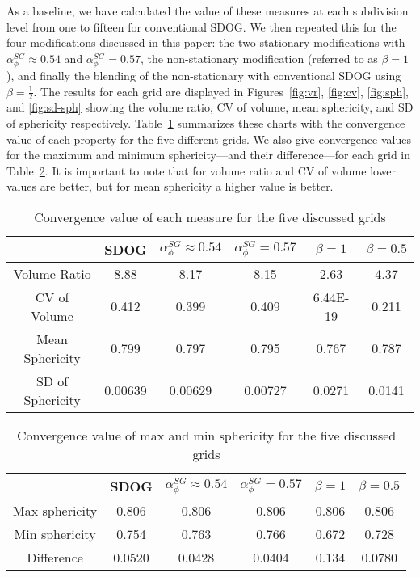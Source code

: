 As a baseline, we have calculated the value of these measures at each subdivision level from one to fifteen for conventional SDOG.
We then repeated this for the four modifications discussed in this paper: the two stationary modifications with $\alpha_{\phi}^{SG} \approx 0.54$ and $\alpha_{\phi}^{SG} = 0.57$, the non-stationary modification (referred to as $\beta = 1$), and finally the blending of the non-stationary with conventional SDOG using $\beta = \frac{1}{2}$.
The results for each grid are displayed in Figures~\ref{fig:vr}, \ref{fig:cv}, \ref{fig:sph}, and \ref{fig:sd-sph} showing the volume ratio, CV of volume, mean sphericity, and SD of sphericity respectively.
Table~\ref{tab:results} summarizes these charts with the convergence value of each property for the five different grids.
We also give convergence values for the maximum and minimum sphericity---and their difference---for each grid in Table~\ref{tab:results-sph}.
It is important to note that for volume ratio and CV of volume lower values are better, but for mean sphericity a higher value is better.


\begin{table}[]
	\centering
	\caption{Convergence value of each measure for the five discussed grids}
	\begin{tabular}{|c|c|c|c|c|c|}
		\hline
		& SDOG & $\alpha_{\phi}^{SG} \approx 0.54$ & $\alpha_{\phi}^{SG} = 0.57$ & $\beta = 1$ & $\beta = 0.5$ \\ \hline
		Volume Ratio     & 8.88   & 8.17   & 8.15   & 2.63      & 4.37   \\ \hline
		CV of Volume     & 0.412  & 0.399  & 0.409  & 6.44E-19  & 0.211  \\ \hline
		Mean Sphericity  & 0.799  & 0.797  & 0.795  & 0.767     & 0.787  \\ \hline
		SD of Sphericity & 0.00639& 0.00629& 0.00727& 0.0271    & 0.0141 \\ \hline
	\end{tabular}
	\label{tab:results}
\end{table}


\begin{table}[]
	\centering
	\caption{Convergence value of max and min sphericity for the five discussed grids}
	\begin{tabular}{|c|c|c|c|c|c|}
		\hline
		& SDOG & $\alpha_{\phi}^{SG} \approx 0.54$ & $\alpha_{\phi}^{SG} = 0.57$ & $\beta = 1$ & $\beta = 0.5$ \\ \hline
		Max sphericity & 0.806  & 0.806  & 0.806  & 0.806 & 0.806  \\ \hline
		Min sphericity & 0.754  & 0.763  & 0.766  & 0.672 & 0.728  \\ \hline
		Difference     & 0.0520 & 0.0428 & 0.0404 & 0.134 & 0.0780 \\ \hline
	\end{tabular}
	\label{tab:results-sph}
\end{table}


